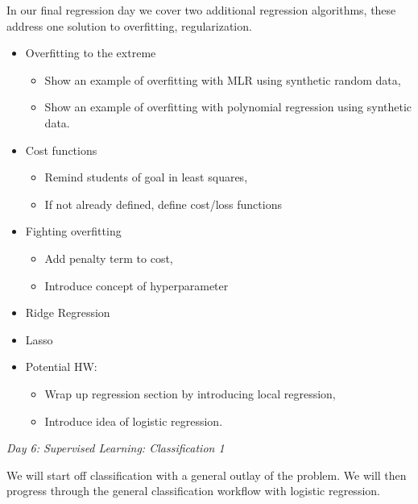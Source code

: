 \documentclass[12pt]{article}
\begin{document}
	\noindent
	In our final regression day we cover two additional regression algorithms, these address one solution to overfitting, regularization.
	\begin{itemize}
		\item Overfitting to the extreme
			\begin{itemize}
				\item Show an example of overfitting with MLR using synthetic random data,
				\item Show an example of overfitting with polynomial regression using synthetic data.
			\end{itemize}
		\item Cost functions
			\begin{itemize}
				\item Remind students of goal in least squares,
				\item If not already defined, define cost/loss functions
			\end{itemize}
		\item Fighting overfitting
			\begin{itemize}
				\item Add penalty term to cost,
				\item Introduce concept of hyperparameter
			\end{itemize}
		\item Ridge Regression
		\item Lasso
		\item Potential HW:
			\begin{itemize}
				\item Wrap up regression section by introducing local regression,
				\item Introduce idea of logistic regression.
			\end{itemize}
	\end{itemize}
	
	\vspace{2mm}
	\noindent
	\textit{\large{Day 6: Supervised Learning: Classification 1}}
	
	\noindent
	We will start off classification with a general outlay of the problem. We will then progress through the general classification workflow with logistic regression.
	
\end{document}
